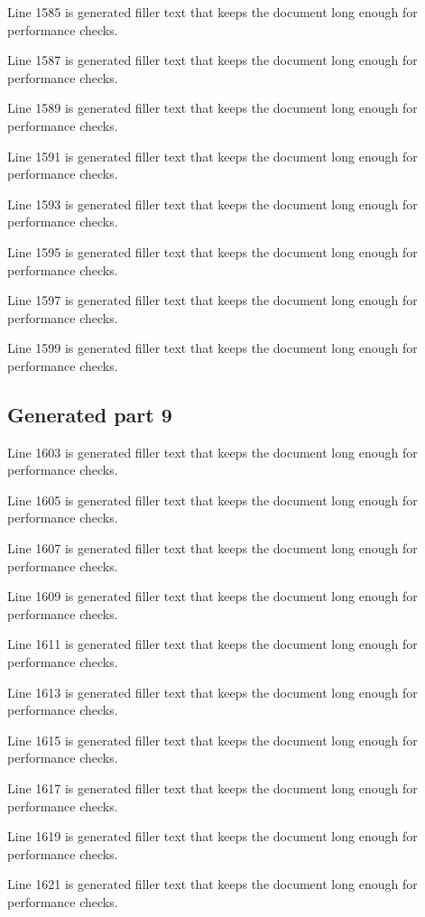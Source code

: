 Line 1585 is generated filler text that keeps the document long enough for performance checks.

Line 1587 is generated filler text that keeps the document long enough for performance checks.

Line 1589 is generated filler text that keeps the document long enough for performance checks.

Line 1591 is generated filler text that keeps the document long enough for performance checks.

Line 1593 is generated filler text that keeps the document long enough for performance checks.

Line 1595 is generated filler text that keeps the document long enough for performance checks.

Line 1597 is generated filler text that keeps the document long enough for performance checks.

Line 1599 is generated filler text that keeps the document long enough for performance checks.

\subsection{Generated part 9}

Line 1603 is generated filler text that keeps the document long enough for performance checks.

Line 1605 is generated filler text that keeps the document long enough for performance checks.

Line 1607 is generated filler text that keeps the document long enough for performance checks.

Line 1609 is generated filler text that keeps the document long enough for performance checks.

Line 1611 is generated filler text that keeps the document long enough for performance checks.

Line 1613 is generated filler text that keeps the document long enough for performance checks.

Line 1615 is generated filler text that keeps the document long enough for performance checks.

Line 1617 is generated filler text that keeps the document long enough for performance checks.

Line 1619 is generated filler text that keeps the document long enough for performance checks.

Line 1621 is generated filler text that keeps the document long enough for performance checks.

